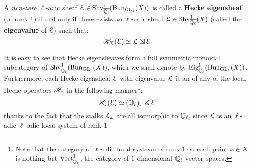         \begin{definition} \label{def: hecke_eigensheaves}
            A \textit{non-zero} $\ell$-adic sheaf $\mathcal{E} \in \mathrm{Shv}_{\overline{\mathbb{Q}_{\ell}}}^1(\mathrm{Bun}_{\operatorname{GL}_1}(X))$ is called a \textbf{Hecke eigensheaf} (of rank $1$) if and only if there exists an $\ell$-adic sheaf $\mathcal{L} \in \mathrm{Shv}_{\overline{\mathbb{Q}_{\ell}}}^1(X)$ (called the \textbf{eigenvalue} of $\mathcal{E}$) such that:
                $$\mathscr{H}_X(\mathcal{E}) \simeq \mathcal{L} \boxtimes \mathcal{E}$$
        \end{definition}
        \begin{remark}
            It is easy to see that Hecke eigensheaves form a full symmetric monoidal subcategory of $\mathrm{Shv}_{\overline{\mathbb{Q}_{\ell}}}^1(\mathrm{Bun}_{\operatorname{GL}_1}(X))$, which we shall denote by $\mathrm{Eig}^1_{\overline{\mathbb{Q}_{\ell}}}(\mathrm{Bun}_{\operatorname{GL}_1}(X))$. Furthermore, each Hecke eigensheaf $\mathcal{E}$ with eigenvalue $\mathcal{L}$ is an  of any of the local Hecke operators $\mathscr{H}_x$ in the following manner\footnote{Note that the category of $\ell$-adic local systesm of rank $1$ on each point $x \in X$ is nothing but $\mathrm{Vect}^1_{\overline{\mathbb{Q}_{\ell}}}$, the category of $1$-dimensional $\overline{\mathbb{Q}_{\ell}}$-vector spaces.}:
                $$\mathscr{H}_x(\mathcal{E}) \simeq (\overline{\mathbb{Q}_{\ell}})_x \boxtimes \mathcal{E}$$
            thanks to the fact that the stalks $\mathcal{L}_x$ are all isomorphic to $\overline{\mathbb{Q}_{\ell}}$, since $\mathcal{L}$ is an $\ell$-adic $\ell$-adic local system of rank $1$.
        \end{remark}
        
